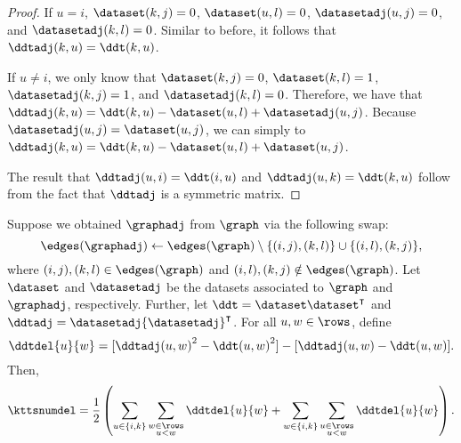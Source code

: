 \begin{proof}
	If $u = i$, $\dataset(k, j) = 0$, $\dataset(u, l) = 0$, $\datasetadj(u, j) =
	0$, and $\datasetadj(k, l) = 0$. Similar to before, it follows that
	$\ddtadj(k, u) = \ddt(k, u)$.

	If $u \neq i$, we only know that $\dataset(k, j) = 0$, $\dataset(k, l) = 1$,
	$\datasetadj(k, j) = 1$, and $\datasetadj(k, l) = 0$. Therefore, we have that
	$\ddtadj(k, u) = \ddt(k, u) - \dataset(u, l) + \datasetadj(u, j)$. Because
	$\datasetadj(u, j) = \dataset(u, j)$, we can simply to $\ddtadj(k, u) =
	\ddt(k, u) - \dataset(u, l) + \dataset(u, j)$.

	The result that $\ddtadj(u, i) = \ddt(i, u)$ and $\ddtadj(u, k) = \ddt(k, u)$
	follow from the fact that $\ddtadj$ is a symmetric matrix.
\end{proof}

\begin{corollary}\label{cor:kttnumdel}
	Suppose we obtained $\graphadj$ from $\graph$ via the following swap:
	\[
		\edges(\graphadj) \leftarrow \edges(\graph) \setminus \{(i, j), (k, l)\}
		\cup \{(i, l), (k, j)\},
	\]
	where $(i, j), (k, l) \in \edges(\graph)$ and $(i, l), (k, j) \notin
	\edges(\graph)$. Let $\dataset$ and $\datasetadj$ be the datasets associated
	to $\graph$ and $\graphadj$, respectively. Further, let $\ddt = \dataset
	\dataset^\intercal$ and $\ddtadj = \datasetadj {\datasetadj}^\intercal$. For
	all $u, w \in \rows$, define
	\[
		\ddtdel{u}{w} = [{\ddtadj(u, w)}^2 - {\ddt(u, w)}^2] - [\ddtadj(u, w) -
		\ddt(u, w)].
	\]
	Then,
	\[
		\kttsnumdel = \frac{1}{2} \left(\sum_{u \in \{i, k\}} \sum_{\substack{w \in
		\rows \\ u < w}} \ddtdel{u}{w} + \sum_{w \in \{i, k\}} \sum_{\substack{u
		\in \rows \\ u < w}} \ddtdel{u}{w} \right).
	\]
\end{corollary}

